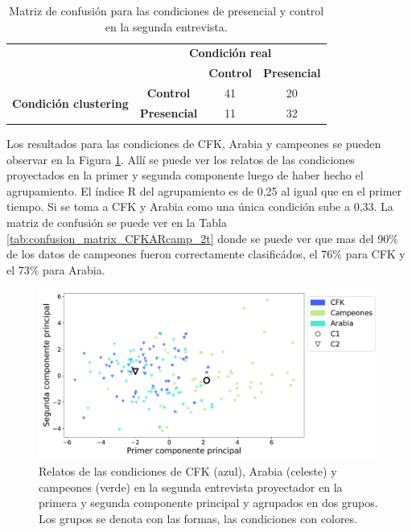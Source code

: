 \begin{table}[htbp]
    \centering
    \begin{tabular}{|l|c|c|c|}
        \cline{3-4}
        \multicolumn{1}{c|}{} & \multicolumn{3}{c|}{\textbf{Condición real}} \\
        \cline{3-4}
        \multicolumn{1}{c}{} & & \textbf{Control} & \textbf{Presencial} \\
        \hline
        \multirow{2}{*}{\textbf{Condición clustering}} & \textbf{Control} & 41 & 20 \\
        \cline{2-4}
        & \textbf{Presencial} & 11 & 32 \\
        \hline
    \end{tabular}
    \caption{Matriz de confusión para las condiciones de presencial y control en la segunda entrevista.}
    \label{tab:confusion_matrix_PyC_2t}
\end{table}


Los resultados para las condiciones de CFK, Arabia y campeones se pueden observar en la Figura \ref{fig:cap3_PC1vsPC2cfkArCamp_segundot}. Allí se puede ver los relatos de las condiciones proyectados en la primer y segunda componente luego de haber hecho el agrupamiento. El índice R del agrupamiento es de 0,25 al igual que en el primer tiempo. Si se toma a CFK y Arabia como una única condición sube a 0,33. La matriz de confusión se puede ver en la Tabla \ref{tab:confusion_matrix_CFKARcamp_2t} donde se puede ver que mas del 90$\%$ de los datos de campeones fueron correctamente clasificádos, el 76$\%$ para CFK y el 73$\%$ para Arabia.

\begin{figure}[H]
    \centering
    \includegraphics[width = 15cm]{figures/ch03/PCA_clustering/Segundo tiempo/cfkArCamp_SEGUNDA_ENT_NOenespaciocosine_PC1vsPC2_markersclusters_colortemas.pdf} 
    \caption{Relatos de las condiciones de CFK (azul), Arabia (celeste) y campeones (verde) en la segunda entrevista proyectador en la primera y segunda componente principal y agrupados en dos grupos. Los grupos se denota con las formas, las condiciones con colores.}
\label{fig:cap3_PC1vsPC2cfkArCamp_segundot}
\end{figure}

